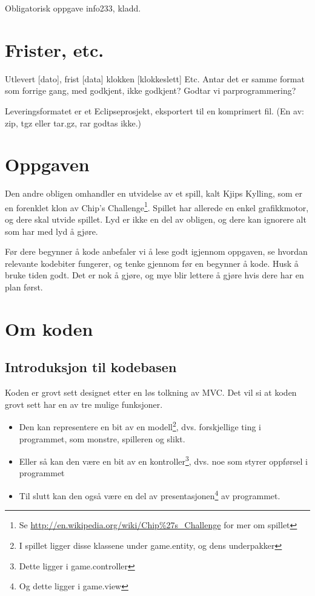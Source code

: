 \documentclass{article}
\begin{document}
Obligatorisk oppgave info233, kladd.

\section{Frister, etc.}
Utlevert [dato], frist [data] klokken [klokkeslett]
Etc. Antar det er samme format som forrige gang, med godkjent, ikke godkjent?
Godtar vi parprogrammering?

Leveringsformatet er et Eclipseprosjekt, eksportert til en komprimert fil. (En av: zip, tgz eller tar.gz, rar godtas ikke.) %


\section{Oppgaven}
Den andre obligen omhandler en utvidelse av et spill, kalt Kjips Kylling, som er en forenklet klon av Chip's Challenge\footnote{Se \url{http://en.wikipedia.org/wiki/Chip\%27s_Challenge} for mer om spillet}.
Spillet har allerede en enkel grafikkmotor, og dere skal utvide spillet.
Lyd er ikke en del av obligen, og dere kan ignorere alt som har med lyd å gjøre. %

Før dere begynner å kode anbefaler vi å lese godt igjennom oppgaven, se hvordan relevante kodebiter fungerer, og tenke gjennom før en begynner å kode.
Husk å bruke tiden godt. Det er nok å gjøre, og mye blir lettere å gjøre hvis dere har en plan først. %

\section{Om koden}
\subsection{Introduksjon til kodebasen}
\label{subsec:kodebase-intro}
Koden er grovt sett designet etter en løs tolkning av MVC.
Det vil si at koden grovt sett har en av tre mulige funksjoner.
\begin{itemize}
\item Den kan representere en bit av en modell\footnote{I spillet ligger disse klassene under game.entity, og dens underpakker}, dvs. forskjellige ting i programmet, som monstre, spilleren og slikt.
\item Eller så kan den være en bit av en kontroller\footnote{Dette ligger i game.controller}, dvs. noe som styrer oppførsel i programmet
\item Til slutt kan den også være en del av presentasjonen\footnote{Og dette ligger i game.view} av programmet.
\end{itemize}
\end{document}
